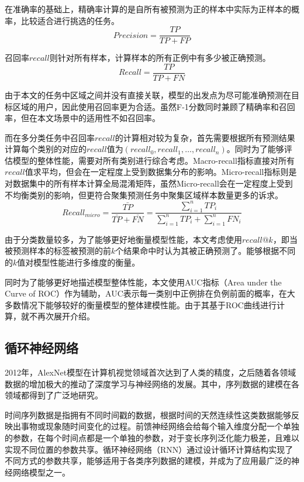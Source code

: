 \documentclass[master]{thesis-uestc}
\begin{document}
在准确率的基础上，精确率计算的是自所有被预测为正的样本中实际为正样本的概率，比较适合进行挑选的任务。
\begin{equation}
   Precision=\frac{TP}{TP+FP}
\end{equation}

召回率$recall$则针对所有样本，计算样本的所有正例中有多少被正确预测。
\begin{equation}
   Recall=\frac{TP}{TP+FN}
\end{equation}

由于本文的任务中区域之间并没有直接关联，模型的出发点为尽可能准确预测在目标区域的用户，因此使用召回率更为合适。虽然F-1分数同时兼顾了精确率和召回率，但在本文场景中的适用性不如召回率。

而在多分类任务中召回率$recall$的计算相对较为复杂，首先需要根据所有预测结果计算每个类别的对应的$recall$值为$(recall_0,recall_1,\dots,recall_n)$。同时为了能够评估模型的整体性能，需要对所有类别进行综合考虑。Macro-recall指标直接对所有$recall$值求平均，但会在一定程度上受到数据集分布的影响。Micro-recall指标则是对数据集中的所有样本计算全局混淆矩阵，虽然Micro-recall会在一定程度上受到不均衡类别的影响，但更符合聚集预测任务中聚集区域样本数量更多的诉求。
\begin{equation}
   Recall_{micro}=\frac{\bar{TP}}{\bar{TP}+\bar{FN}} = \frac{\sum_{i=1}^n TP_i}{\sum_{i=1}^n TP_i+\sum_{i=1}^n FN_i}
\end{equation}

由于分类数量较多，为了能够更好地衡量模型性能，本文考虑使用$recall@k$，即当被预测样本的标签被预测的前$k$个结果命中时认为其被正确预测了。能够根据不同的$k$值对模型性能进行多维度的衡量。

同时为了能够更好地描述模型整体性能，本文使用AUC指标（Area under the Curve of ROC）作为辅助，AUC表示每一类别中正例排在负例前面的概率，在大多数情况下能够较好的衡量模型的整体建模性能。由于其基于ROC曲线进行计算，就不再次展开介绍。

\subsection{循环神经网络}
2012年，AlexNet模型在计算机视觉领域首次达到了人类的精度，之后随着各领域数据的增加极大的推动了深度学习与神经网络的发展。其中，序列数据的建模在各领域都得到了广泛地研究。

时间序列数据是指拥有不同时间戳的数据，根据时间的天然连续性这类数据能够反映出事物或现象随时间变化的过程。前馈神经网络会给每个输入维度分配一个单独的参数，在每个时间点都是一个单独的参数，对于变长序列泛化能力极差，且难以实现不同位置的参数共享。循环神经网络（RNN）通过设计循环计算结构实现了不同方式的参数共享，能够适用于各类序列数据的建模，并成为了应用最广泛的神经网络模型之一。
\end{document}
